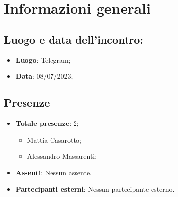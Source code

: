 \section{Informazioni generali}
    \subsection{Luogo e data dell'incontro:}
    \begin{itemize}
        \item \textbf{Luogo}: Telegram;
        \item \textbf{Data}: 08/07/2023;
    \end{itemize}
    \subsection{Presenze}
    \begin{itemize}
        \item \textbf{Totale presenze}: 2;
        \begin{itemize}
            \item Mattia Casarotto;
            \item Alessandro Massarenti;
        \end{itemize}
        \item \textbf{Assenti}: Nessun assente.
        \item \textbf{Partecipanti esterni}: Nessun partecipante esterno.
    \end{itemize}